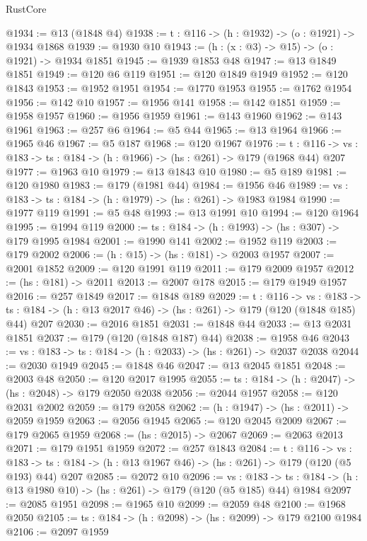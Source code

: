 \begin{lexlean}{RustCore}
\begin{coremodule}
@1934 := @13 (@1848 @4)
@1938 := {t : @116} -> (h : @1932) -> (o : @1921) -> @1934 @1868
@1939 := @1930 @10
@1943 := (h : (x : @3) -> @15) -> (o : @1921) -> @1934 @1851
@1945 := @1939 @1853 @48
@1947 := @13 @1849 @1851
@1949 := @120 @6 @119
@1951 := @120 @1849 @1949
@1952 := @120 @1843
@1953 := @1952 @1951
@1954 := @1770 @1953
@1955 := @1762 @1954
@1956 := @142 @10
@1957 := @1956 @141
@1958 := @142 @1851
@1959 := @1958 @1957
@1960 := @1956 @1959
@1961 := @143 @1960
@1962 := @143 @1961
@1963 := @257 @6
@1964 := @5 @44
@1965 := @13 @1964
@1966 := @1965 @46
@1967 := @5 @187
@1968 := @120 @1967
@1976 := {t : @116} ->
  {vs : @183} -> {ts : @184} -> (h : @1966) -> (hs : @261) -> @179 (@1968 @44) @207
@1977 := @1963 @10
@1979 := @13 @1843 @10
@1980 := @5 @189
@1981 := @120 @1980
@1983 := @179 (@1981 @44)
@1984 := @1956 @46
@1989 := {vs : @183} -> {ts : @184} -> (h : @1979) -> (hs : @261) -> @1983 @1984
@1990 := @1977 @119
@1991 := @5 @48
@1993 := @13 @1991 @10
@1994 := @120 @1964
@1995 := @1994 @119
@2000 := {ts : @184} -> (h : @1993) -> (hs : @307) -> @179 @1995 @1984
@2001 := @1990 @141
@2002 := @1952 @119
@2003 := @179 @2002
@2006 := (h : @15) -> (hs : @181) -> @2003 @1957
@2007 := @2001 @1852
@2009 := @120 @1991 @119
@2011 := @179 @2009 @1957
@2012 := (hs : @181) -> @2011
@2013 := @2007 @178
@2015 := @179 @1949 @1957
@2016 := @257 @1849
@2017 := @1848 @189
@2029 := {t : @116} ->
  {vs : @183} ->
  {ts : @184} -> (h : @13 @2017 @46) -> (hs : @261) -> @179 (@120 (@1848 @185) @44) @207
@2030 := @2016 @1851
@2031 := @1848 @44
@2033 := @13 @2031 @1851
@2037 := @179 (@120 (@1848 @187) @44)
@2038 := @1958 @46
@2043 := {vs : @183} -> {ts : @184} -> (h : @2033) -> (hs : @261) -> @2037 @2038
@2044 := @2030 @1949
@2045 := @1848 @46
@2047 := @13 @2045 @1851
@2048 := @2003 @48
@2050 := @120 @2017 @1995
@2055 := {ts : @184} -> (h : @2047) -> (hs : @2048) -> @179 @2050 @2038
@2056 := @2044 @1957
@2058 := @120 @2031 @2002
@2059 := @179 @2058
@2062 := (h : @1947) -> (hs : @2011) -> @2059 @1959
@2063 := @2056 @1945
@2065 := @120 @2045 @2009
@2067 := @179 @2065 @1959
@2068 := (hs : @2015) -> @2067
@2069 := @2063 @2013
@2071 := @179 @1951 @1959
@2072 := @257 @1843
@2084 := {t : @116} ->
  {vs : @183} -> {ts : @184} -> (h : @13 @1967 @46) -> (hs : @261) -> @179 (@120 (@5 @193) @44) @207
@2085 := @2072 @10
@2096 := {vs : @183} ->
  {ts : @184} -> (h : @13 @1980 @10) -> (hs : @261) -> @179 (@120 (@5 @185) @44) @1984
@2097 := @2085 @1951
@2098 := @1965 @10
@2099 := @2059 @48
@2100 := @1968 @2050
@2105 := {ts : @184} -> (h : @2098) -> (hs : @2099) -> @179 @2100 @1984
@2106 := @2097 @1959

\end{coremodule}
\end{lexlean}
